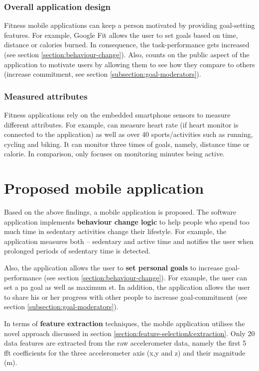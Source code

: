         \subsubsection{Overall application design}
        Fitness mobile applications can keep a person motivated by providing goal-setting features. For example, Google Fit \citep{googleinc2017} allows the user to set goals based on time, distance or calories burned. In consequence, the task-performance gets increased (see section \ref{section:behaviour-change}). Also, \citet[]{human2017} counts on the public aspect of the application to motivate users by allowing them to see how they compare to others (increase commitment, see section \ref{subsection:goal-moderators}).
        
        \subsubsection{Measured attributes}
        Fitness applications rely on the embedded smartphone sensors to measure different attributes. For example, \citet[]{endomondo2017} can measure heart rate (if heart monitor is connected to the application) as well as over 40 sports/activities such as running, cycling and biking. It can monitor three times of goals, namely, distance time or calorie. In comparison, \citet[]{human2017} only focuses on monitoring minutes being active.
        
\section{Proposed mobile application}
\label{section:proposed-application}
Based on the above findings, a mobile application is proposed. The software application implements \textbf{behaviour change logic} to help people who spend too much time in sedentary activities change their lifestyle. For example, the application measures both – sedentary and active time and notifies the user when prolonged periods of sedentary time is detected. 

Also, the application allows the user to \textbf{set personal goals} to increase goal-performance (see section \ref{section:behaviour-change}). For example, the user can set a \gls{pa} goal as well as maximum \gls{st}. In addition, the application allows the user to share his or her progress with other people to increase goal-commitment (see section \ref{subsection:goal-moderators}).

In terms of \textbf{feature extraction} techniques, the mobile application utilises the novel approach discussed in section \ref{section:feature-selection&extraction}. Only 20 data features are extracted from the raw accelerometer data, namely the first 5 \gls{fft} coefficients for the three accelerometer axis (x,y and z) and their magnitude (m).

